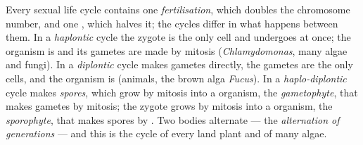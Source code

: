 \begin{definition}\label{def:b2:plant-life-cycles:cycles}
Every sexual life cycle contains one \emph{fertilisation}, which
doubles the chromosome number, and one \emph{}, which halves
it; the cycles differ in what happens between them. In a
\emph{haplontic} cycle the zygote is the only  cell and
undergoes  at once; the organism is  and its gametes
are made by mitosis (\emph{Chlamydomonas}, many algae and fungi).
In a \emph{diplontic} cycle  makes gametes directly, the
gametes are the only  cells, and the organism is 
(animals, the brown alga \emph{Fucus}). In a \emph{haplo-diplontic}
cycle  makes \emph{spores}, which grow by mitosis into a
 organism, the \emph{gametophyte}, that makes gametes by
mitosis; the zygote grows by mitosis into a  organism, the
\emph{sporophyte}, that makes spores by . Two 
bodies alternate --- the \emph{alternation of generations} --- and
this is the cycle of every land plant and of many algae.
\end{definition}


